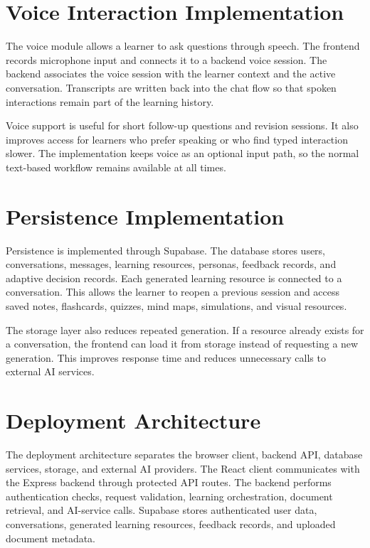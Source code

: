 \section[Voice Interaction Implementation]{\textbf{Voice Interaction Implementation}}
The voice module allows a learner to ask questions through speech. The frontend records microphone input and connects it to a backend voice session. The backend associates the voice session with the learner context and the active conversation. Transcripts are written back into the chat flow so that spoken interactions remain part of the learning history.

Voice support is useful for short follow-up questions and revision sessions. It also improves access for learners who prefer speaking or who find typed interaction slower. The implementation keeps voice as an optional input path, so the normal text-based workflow remains available at all times.

\section[Persistence Implementation]{\textbf{Persistence Implementation}}
Persistence is implemented through Supabase. The database stores users, conversations, messages, learning resources, personas, feedback records, and adaptive decision records. Each generated learning resource is connected to a conversation. This allows the learner to reopen a previous session and access saved notes, flashcards, quizzes, mind maps, simulations, and visual resources.

The storage layer also reduces repeated generation. If a resource already exists for a conversation, the frontend can load it from storage instead of requesting a new generation. This improves response time and reduces unnecessary calls to external AI services.

\section[Deployment Architecture]{\textbf{Deployment Architecture}}
The deployment architecture separates the browser client, backend API, database services, storage, and external AI providers. The React client communicates with the Express backend through protected API routes. The backend performs authentication checks, request validation, learning orchestration, document retrieval, and AI-service calls. Supabase stores authenticated user data, conversations, generated learning resources, feedback records, and uploaded document metadata.

